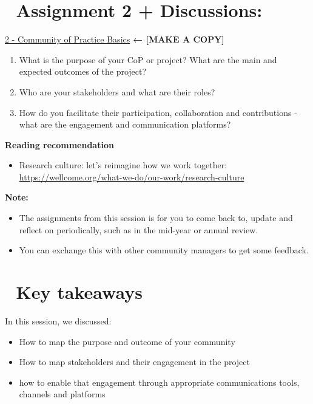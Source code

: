 \documentclass[
  letterpaper,
  DIV=11,
  numbers=noendperiod]{scrreport}
\providecommand{\tightlist}{%
  \setlength{\itemsep}{0pt}\setlength{\parskip}{0pt}}\usepackage{longtable,booktabs,array}
\begin{document}
\hypertarget{assignment-2-discussions}{%
\section{\texorpdfstring{📝 \textbf{Assignment 2 +
Discussions:}}{📝 Assignment 2 + Discussions:}}\label{assignment-2-discussions}}

\href{https://docs.google.com/document/d/1r08Yu2tG8DcOiMpF6bbHrlgMRdePNxlWSRd3tvK7fcQ/edit?usp=sharing}{2
- Community of Practice Basics} \textbf{← {[}MAKE A COPY{]}}

\begin{enumerate}
\def\labelenumi{\arabic{enumi}.}
\tightlist
\item
  What is the purpose of your CoP or project? What are the main and
  expected outcomes of the project?
\item
  Who are your stakeholders and what are their roles?
\item
  How do you facilitate their participation, collaboration and
  contributions - what are the engagement and communication platforms?
\end{enumerate}

\textbf{Reading recommendation}

\begin{itemize}
\tightlist
\item
  Research culture: let's reimagine how we work together:
  \url{https://wellcome.org/what-we-do/our-work/research-culture}
\end{itemize}

\textbf{Note:}

\begin{itemize}
\tightlist
\item
  The assignments from this session is for you to come back to, update
  and reflect on periodically, such as in the mid-year or annual review.
\item
  You can exchange this with other community managers to get some
  feedback.
\end{itemize}

\hypertarget{key-takeaways-1}{%
\section{🏡 Key takeaways}\label{key-takeaways-1}}

In this session, we discussed:

\begin{itemize}
\tightlist
\item
  How to map the purpose and outcome of your community
\item
  How to map stakeholders and their engagement in the project
\item
  how to enable that engagement through appropriate communications
  tools, channels and platforms
\end{itemize}
\end{document}
